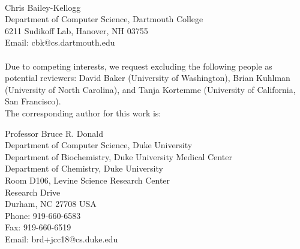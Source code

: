 \documentclass[11pt, oneside]{article}   	%
\begin{document}
   \\\hspace{-0.285in} Chris Bailey-Kellogg \\Department of Computer Science, Dartmouth College \\6211 Sudikoff Lab, Hanover, NH 03755 \\Email: cbk@cs.dartmouth.edu \\
   \\Due to competing interests, we request excluding the following people as potential reviewers: David Baker (University of Washington), Brian Kuhlman (University of North Carolina), and Tanja Kortemme (University of California, San Francisco).  
   \\
   
   The corresponding author for this work is: 
 
    \hspace{-0.285in} Professor Bruce R. Donald \\Department of Computer Science, Duke University \\Department of Biochemistry, Duke University Medical Center  \\Department of Chemistry, Duke University \\Room D106, Levine Science Research Center \\Research Drive \\Durham, NC 27708 USA \\Phone: 919-660-6583 \\Fax: 919-660-6519 \\Email: brd+jcc18@cs.duke.edu \\
\end{document}
